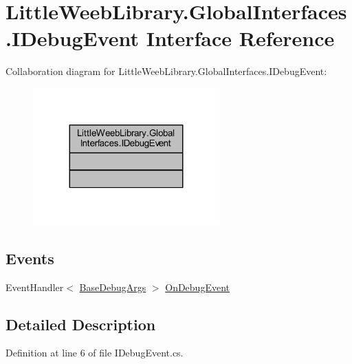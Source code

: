 \hypertarget{interface_little_weeb_library_1_1_global_interfaces_1_1_i_debug_event}{}\section{Little\+Weeb\+Library.\+Global\+Interfaces.\+I\+Debug\+Event Interface Reference}
\label{interface_little_weeb_library_1_1_global_interfaces_1_1_i_debug_event}


Collaboration diagram for Little\+Weeb\+Library.\+Global\+Interfaces.\+I\+Debug\+Event\+:\nopagebreak
\begin{figure}[H]
\begin{center}
\leavevmode
\includegraphics[width=203pt]{interface_little_weeb_library_1_1_global_interfaces_1_1_i_debug_event__coll__graph}
\end{center}
\end{figure}
\subsection*{Events}
\begin{DoxyCompactItemize}
\item 
Event\+Handler$<$ \mbox{\hyperlink{class_little_weeb_library_1_1_event_arguments_1_1_base_debug_args}{Base\+Debug\+Args}} $>$ \mbox{\hyperlink{interface_little_weeb_library_1_1_global_interfaces_1_1_i_debug_event_a98e8f7816df18ade00fb1b7f285bd335}{On\+Debug\+Event}}
\end{DoxyCompactItemize}


\subsection{Detailed Description}


Definition at line 6 of file I\+Debug\+Event.\+cs.



